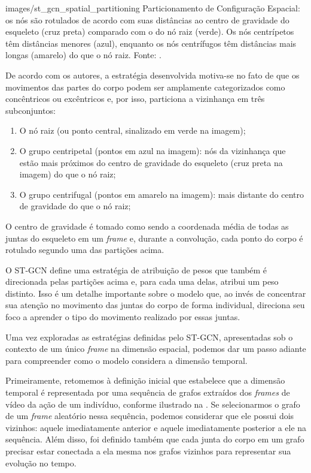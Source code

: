     {images/st_gcn_spatial_partitioning}
    {Particionamento de Configuração Espacial: os nós são rotulados de acordo com suas distâncias ao centro de gravidade do esqueleto (cruz preta) comparado com o do nó raiz (verde). Os nós centrípetos têm distâncias menores (azul), enquanto os nós centrífugos têm distâncias mais longas (amarelo) do que o nó raiz. Fonte: \cite[p. 5]{st-gcn-2018}.}

De acordo com os autores, a estratégia desenvolvida motiva-se no fato de que os movimentos das partes do corpo podem ser amplamente categorizados como concêntricos ou excêntricos e, por isso, particiona a vizinhança em três subconjuntos:

\begin{enumerate}
    \item O nó raiz (ou ponto central, sinalizado em verde na imagem);
    \item O grupo centripetal (pontos em azul na imagem): nós da vizinhança que estão mais próximos do centro de gravidade do esqueleto (cruz preta na imagem) do que o nó raiz;
    \item O grupo centrifugal (pontos em amarelo na imagem): mais distante do centro de gravidade do que o nó raiz;
\end{enumerate}

O centro de gravidade é tomado como sendo a coordenada média de todas as juntas do esqueleto em um \textit{frame} e, durante a convolução, cada ponto do corpo é rotulado segundo uma das partições acima.

O ST-GCN define uma estratégia de atribuição de pesos que também é direcionada pelas partições acima e, para cada uma delas, atribui um peso distinto. Isso é um detalhe importante sobre o modelo que, ao invés de concentrar sua atenção no movimento das juntas do corpo de forma individual,  direciona seu foco a aprender o tipo do movimento realizado por essas juntas.

Uma vez exploradas as estratégias definidas pelo ST-GCN, apresentadas sob o contexto de um único \textit{frame} na dimensão espacial, podemos dar um passo adiante para compreender como o modelo considera a dimensão temporal. 

Primeiramente, retomemos à definição inicial que estabelece que a dimensão temporal é representada por uma sequência de grafos extraídos dos \textit{frames} de vídeo da ação de um indivíduo, conforme ilustrado na . Se selecionarmos o grafo de um \textit{frame} aleatório nessa sequência, podemos considerar que ele possui dois vizinhos: aquele imediatamente anterior e aquele imediatamente posterior a ele na sequência. Além disso, foi definido também que cada junta do corpo em um grafo precisar estar conectada a ela mesma nos grafos vizinhos para representar sua evolução no tempo.

